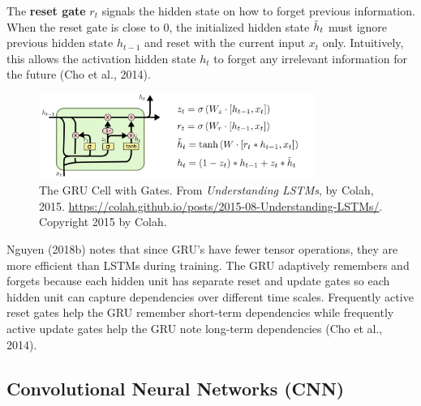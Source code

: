 The \textbf{reset gate} $r_t$ signals the hidden state on how to forget previous information. When the reset gate is close to $0$, the initialized hidden state $\Tilde{h}_t$ must ignore previous hidden state $h_{t-1}$ and reset with the current input $x_t$ only. Intuitively, this allows the activation hidden state $h_t$ to forget any irrelevant information for the future (Cho et al., 2014). 

\begin{figure}[h]
\vspace{-5pt}
\centering
\includegraphics[width=0.8\textwidth]{imgs/gru_withformula.png}
\vspace{-5pt}
\caption{\footnotesize The GRU Cell with Gates. From \emph{Understanding LSTMs}, by Colah, 2015. \url{https://colah.github.io/posts/2015-08-Understanding-LSTMs/}. Copyright 2015 by Colah.}
\vspace{-5pt}
\end{figure}

Nguyen (2018b) notes that since GRU's have fewer tensor operations, they are more efficient than LSTMs during training. 
The GRU adaptively remembers and forgets because each hidden unit has separate reset and update gates so each hidden unit can capture dependencies over different time scales. Frequently active reset gates help the GRU remember short-term dependencies while frequently active update gates help the GRU note long-term dependencies (Cho et al., 2014). 


\subsection{Convolutional Neural Networks (CNN)}